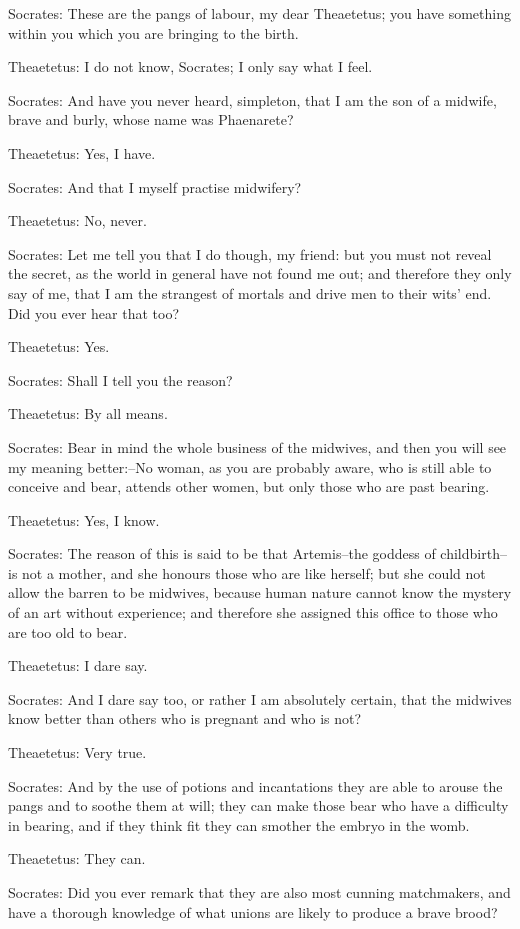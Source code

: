 Socrates: These are the pangs of labour, my dear Theaetetus; you have
something within you which you are bringing to the birth.

Theaetetus: I do not know, Socrates; I only say what I feel.

Socrates: And have you never heard, simpleton, that I am the son of a
midwife, brave and burly, whose name was Phaenarete?

Theaetetus: Yes, I have.

Socrates: And that I myself practise midwifery?

Theaetetus: No, never.

Socrates: Let me tell you that I do though, my friend: but you must not
reveal the secret, as the world in general have not found me out; and
therefore they only say of me, that I am the strangest of mortals and
drive men to their wits' end. Did you ever hear that too?

Theaetetus: Yes.

Socrates: Shall I tell you the reason?

Theaetetus: By all means.

Socrates: Bear in mind the whole business of the midwives, and then you
will see my meaning better:--No woman, as you are probably aware, who is
still able to conceive and bear, attends other women, but only those who
are past bearing.

Theaetetus: Yes, I know.

Socrates: The reason of this is said to be that Artemis--the goddess of
childbirth--is not a mother, and she honours those who are like herself;
but she could not allow the barren to be midwives, because human nature
cannot know the mystery of an art without experience; and therefore she
assigned this office to those who are too old to bear.

Theaetetus: I dare say.

Socrates: And I dare say too, or rather I am absolutely certain, that
the midwives know better than others who is pregnant and who is not?

Theaetetus: Very true.

Socrates: And by the use of potions and incantations they are able to
arouse the pangs and to soothe them at will; they can make those bear
who have a difficulty in bearing, and if they think fit they can smother
the embryo in the womb.

Theaetetus: They can.

Socrates: Did you ever remark that they are also most cunning
matchmakers, and have a thorough knowledge of what unions are likely to
produce a brave brood?

